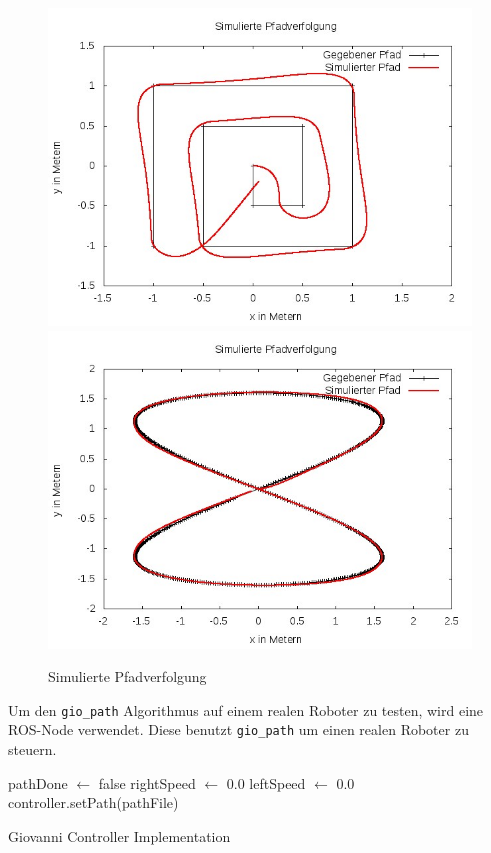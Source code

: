 \documentclass[11pt,a4paper]{article}
\begin{document}
{\begin{figure}[h]
	\includegraphics[width=\linewidth]{pictures/simulated_spirale.jpg}
	\includegraphics[width=\linewidth]{pictures/simulated_acht.jpg}
	\caption{Simulierte Pfadverfolgung}
\end{figure}

Um den \texttt{gio\_path} Algorithmus auf einem realen Roboter zu testen, wird eine ROS-Node verwendet. Diese benutzt  \texttt{gio\_path} um einen realen Roboter zu steuern.


\begin{algorithm}
	
	pathDone $\leftarrow$ false\;
	rightSpeed $\leftarrow$ 0.0\;
	leftSpeed $\leftarrow$ 0.0\;
	controller.setPath(pathFile)\;
\caption{Giovanni Controller Implementation}
\end{algorithm}

}
\end{document}
